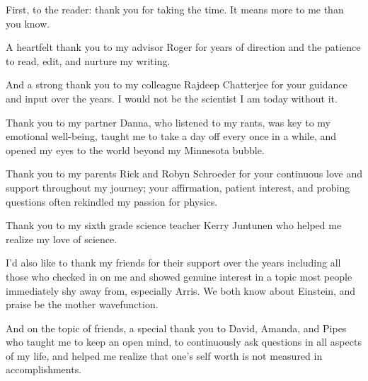 
First, to the reader: thank you for taking the time. It means more to me than you know. 

A heartfelt thank you to my advisor Roger for years of direction and the patience to read, edit, and nurture my writing.

And a strong thank you to my colleague Rajdeep Chatterjee for your guidance and input over the years. I would not be the scientist I am today without it. 

Thank you to my partner Danna, who listened to my rants, was key to my emotional well-being, taught me to take a day off every once in a while, and opened my eyes to the world beyond my Minnesota bubble.

Thank you to my parents Rick and Robyn Schroeder for your continuous love and support throughout my journey; your affirmation, patient interest, and probing questions often rekindled my passion for physics. 

Thank you to my sixth grade science teacher Kerry Juntunen who helped me realize my love of science. 

I'd also like to thank my friends for their support over the years including all those who checked in on me and showed genuine interest in a topic most people immediately shy away from, especially Arris. We both know about Einstein, and praise be the mother wavefunction. 
    
And on the topic of friends, a special thank you to David, Amanda, and Pipes who taught me to keep an open mind, to continuously ask questions in all aspects of my life, and helped me realize that one's self worth is not measured in accomplishments.


